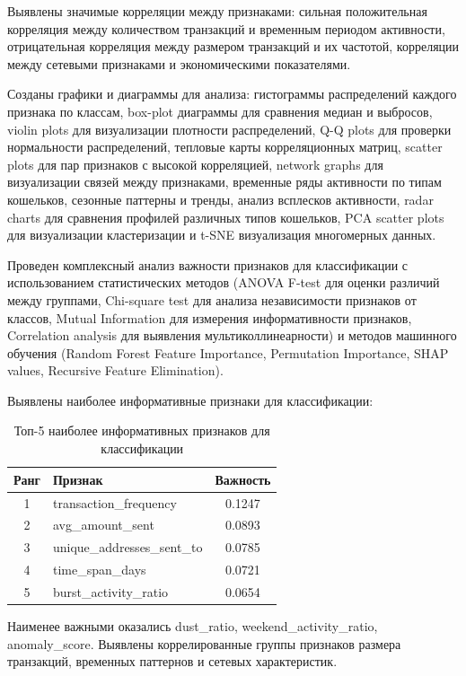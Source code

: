 Выявлены значимые корреляции между признаками: сильная положительная корреляция между количеством транзакций и временным периодом активности, отрицательная корреляция между размером транзакций и их частотой, корреляции между сетевыми признаками и экономическими показателями.

Созданы графики и диаграммы для анализа: гистограммы распределений каждого признака по классам, box-plot диаграммы для сравнения медиан и выбросов, violin plots для визуализации плотности распределений, Q-Q plots для проверки нормальности распределений, тепловые карты корреляционных матриц, scatter plots для пар признаков с высокой корреляцией, network graphs для визуализации связей между признаками, временные ряды активности по типам кошельков, сезонные паттерны и тренды, анализ всплесков активности, radar charts для сравнения профилей различных типов кошельков, PCA scatter plots для визуализации кластеризации и t-SNE визуализация многомерных данных.

Проведен комплексный анализ важности признаков для классификации с использованием статистических методов (ANOVA F-test для оценки различий между группами, Chi-square test для анализа независимости признаков от классов, Mutual Information для измерения информативности признаков, Correlation analysis для выявления мультиколлинеарности) и методов машинного обучения (Random Forest Feature Importance, Permutation Importance, SHAP values, Recursive Feature Elimination).

Выявлены наиболее информативные признаки для классификации:

\begin{table}[H]
\centering
\caption{Топ-5 наиболее информативных признаков для классификации}
\label{tab:top_features}
\begin{tabular}{|c|l|c|}
\hline
\textbf{Ранг} & \textbf{Признак} & \textbf{Важность} \\
\hline
1 & transaction\_frequency & 0.1247 \\
2 & avg\_amount\_sent & 0.0893 \\
3 & unique\_addresses\_sent\_to & 0.0785 \\
4 & time\_span\_days & 0.0721 \\
5 & burst\_activity\_ratio & 0.0654 \\
\hline
\end{tabular}
\end{table}

Наименее важными оказались dust\_ratio, weekend\_activity\_ratio, anomaly\_score. Выявлены коррелированные группы признаков размера транзакций, временных паттернов и сетевых характеристик.

